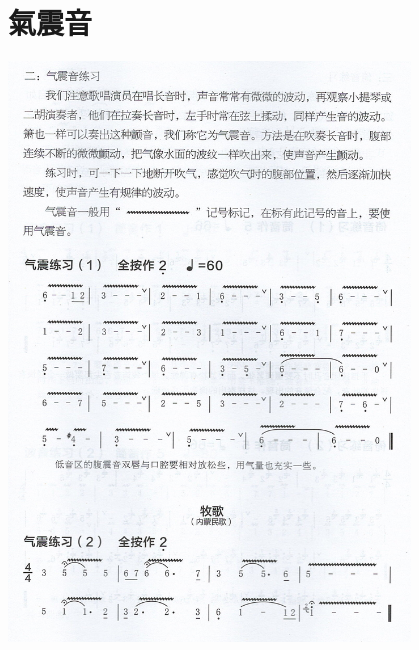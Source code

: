 \documentclass[cn,pad,twocol]{elegantbook}
\begin{document}
\section{氣震音}                \includegraphics[width=0.8\textwidth]{dongxiao/Scan 8.jpeg}
\end{document}
